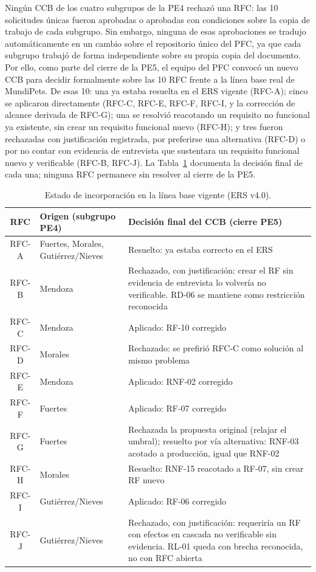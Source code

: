 \documentclass[journal,onecolumn]{IEEEtran}
\begin{document}
Ningún CCB de los cuatro subgrupos de la PE4 rechazó una RFC: las 10
solicitudes únicas fueron aprobadas o aprobadas con condiciones sobre la
copia de trabajo de cada subgrupo. Sin embargo, ninguna de esas
aprobaciones se tradujo automáticamente en un cambio sobre el
repositorio único del PFC, ya que cada subgrupo trabajó de forma
independiente sobre su propia copia del documento. Por ello, como parte
del cierre de la PE5, el equipo del PFC convocó un nuevo CCB para
decidir formalmente sobre las 10 RFC frente a la línea base real de
MundiPets. De esas 10: una ya estaba resuelta en el ERS vigente (RFC-A);
cinco se aplicaron directamente (RFC-C, RFC-E, RFC-F, RFC-I, y la
corrección de alcance derivada de RFC-G); una se resolvió reacotando un
requisito no funcional ya existente, sin crear un requisito funcional
nuevo (RFC-H); y tres fueron rechazadas con justificación registrada,
por preferirse una alternativa (RFC-D) o por no contar con evidencia de
entrevista que sustentara un requisito funcional nuevo y verificable
(RFC-B, RFC-J). La Tabla~\ref{tab:rfc_estado} documenta la decisión final
de cada una; ninguna RFC permanece sin resolver al cierre de la PE5.

\begin{table}[H]
	\centering
	\caption{Estado de incorporación en la línea base vigente (ERS v4.0).}
	\label{tab:rfc_estado}
	\small
	\begin{tabularx}{\textwidth}{|c|X|X|}
		\hline
		\textbf{RFC} & \textbf{Origen (subgrupo PE4)} & \textbf{Decisión final del CCB (cierre PE5)} \\
		\hline
		RFC-A & Fuertes, Morales, Gutiérrez/Nieves & Resuelto: ya estaba correcto en el ERS \\
		\hline
		RFC-B & Mendoza & Rechazado, con justificación: crear el RF sin evidencia de entrevista lo volvería no verificable. RD-06 se mantiene como restricción reconocida \\
		\hline
		RFC-C & Mendoza & Aplicado: RF-10 corregido \\
		\hline
		RFC-D & Morales & Rechazado: se prefirió RFC-C como solución al mismo problema \\
		\hline
		RFC-E & Mendoza & Aplicado: RNF-02 corregido \\
		\hline
		RFC-F & Fuertes & Aplicado: RF-07 corregido \\
		\hline
		RFC-G & Fuertes & Rechazada la propuesta original (relajar el umbral); resuelto por vía alternativa: RNF-03 acotado a producción, igual que RNF-02 \\
		\hline
		RFC-H & Morales & Resuelto: RNF-15 reacotado a RF-07, sin crear RF nuevo \\
		\hline
		RFC-I & Gutiérrez/Nieves & Aplicado: RF-06 corregido \\
		\hline
		RFC-J & Gutiérrez/Nieves & Rechazado, con justificación: requeriría un RF con efectos en cascada no verificable sin evidencia. RL-01 queda con brecha reconocida, no con RFC abierta \\
		\hline
	\end{tabularx}
\end{table}
\end{document}
